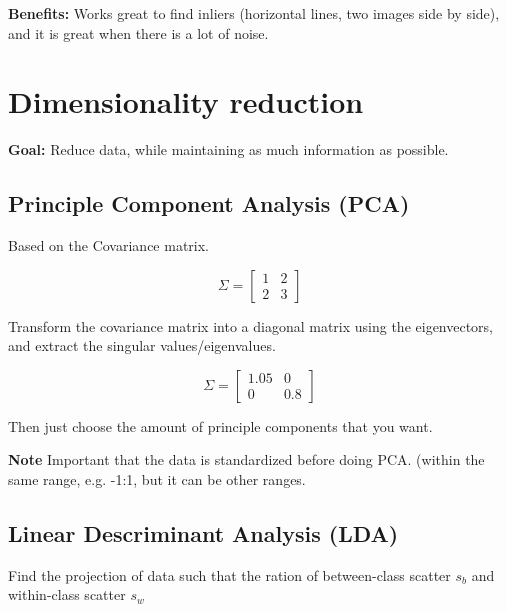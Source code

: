 \documentclass[a4paper]{article}
\begin{document}
\textbf{Benefits:} Works great to find inliers (horizontal lines, two images side by side), and it is great when there is a lot of noise. 


\section{Dimensionality reduction}
\textbf{Goal:} Reduce data, while maintaining as much information as possible.

\subsection{Principle Component Analysis (PCA)}
Based on the Covariance matrix.
\hfill {}

\begin{equation}
\Sigma = \begin{bmatrix}
1 & 2 \\
2 & 3
\end{bmatrix}
\end{equation}

Transform the covariance matrix into a diagonal matrix using the eigenvectors, and extract the singular values/eigenvalues.


\begin{equation}
\Sigma = \begin{bmatrix}
1.05 & 0 \\
0 & 0.8
\end{bmatrix}
\end{equation}

Then just choose the amount of principle components that you want.

\vspace{5pt}

\textbf{Note} Important that the data is standardized before doing PCA. (within the same range, e.g. -1:1, but it can be other ranges.


\hfill {}

\subsection{Linear Descriminant Analysis (LDA)}
Find the projection of data such that the ration of between-class scatter $ s_b $ and within-class scatter $ s_w $ 
\end{document}
